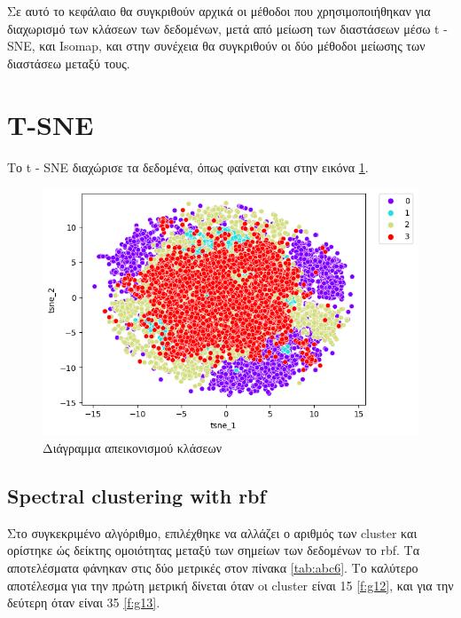 Σε αυτό το κεφάλαιο θα συγκριθούν αρχικά οι μέθοδοι που χρησιμοποιήθηκαν για διαχωρισμό των κλάσεων των δεδομένων, μετά από μείωση των διαστάσεων μέσω t - SNE, και Isomap, και στην συνέχεια
θα συγκριθούν οι δύο μέθοδοι μείωσης των διαστάσεω μεταξύ τους.
\section{T-SNE}
Το t - SNE διαχώρισε τα δεδομένα, όπως φαίνεται και στην εικόνα \ref{f:g10}.
\begin{figure}[ht]
	\centering
	\includegraphics[width=1\linewidth]{Imagedata1/tsne1.png}
	\caption{ Διάγραμμα απεικονισμού κλάσεων }
	\label{f:g10}	
\end{figure}

\clearpage

\subsection{Spectral clustering with rbf}

Στο συγκεκριμένο αλγόριθμο, επιλέχθηκε να αλλάζει ο αριθμός των cluster και ορίστηκε ώς δείκτης ομοιότητας μεταξύ των σημείων των δεδομένων το rbf.
Τα αποτελέσματα φάνηκαν στις δύο μετρικές στον πίνακα \ref{tab:abc6}. Το καλύτερο αποτέλεσμα για την πρώτη μετρική δίνεται όταν oι cluster είναι 15 \ref{f:g12}, και για την δεύτερη όταν είναι 35 \ref{f:g13}.

